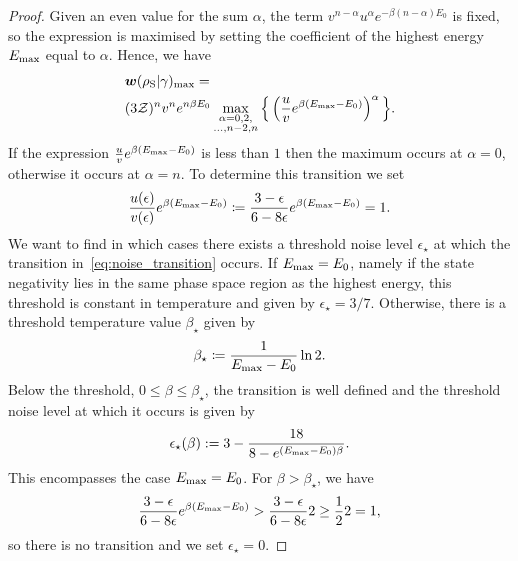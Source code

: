 \documentclass[pra,
aps,
twocolumn,
superscriptaddress,
groupedaddress,
nofootinbib,
reprint
]{revtex4-1}
\begin{document}
\begin{proof}
Given an even value for the sum $\alpha$, the term $v^{n-\alpha} u^{\alpha} e^{-\beta (n-\alpha)E_0}$ is fixed, so the expression is maximised by setting the coefficient of the highest energy $E_{\rm{max}}$ equal to $\alpha$.
Hence, we have
\begin{align}
	&\bm{w}(\rho_{\rm{S}} | \gamma)_{\rm{max}} = \nonumber\\
	&(3\mathcal{Z})^{n} v^n e^{n\beta E_0}\max\limits_{\substack{\alpha = 0,2, \\ \dots,n-2,n}}{\Big\{ \left( \frac{u}{v} e^{\beta (E_{\rm{max}} - E_0)} \right)^{\alpha} \Big\}}.
\end{align}
If the expression $\frac{u}{v} e^{\beta (E_{\rm{max}} - E_0)}$ is less than $1$ then the maximum occurs at $\alpha=0$, otherwise it occurs at $\alpha = n$. 
To determine this transition we set
\begin{equation}\label{eq:noise_transition}
	\frac{u(\epsilon)}{v(\epsilon)} e^{\beta (E_{\rm{max}} - E_0)} \coloneqq \frac{3-\epsilon}{6-8\epsilon} e^{\beta (E_{\rm{max}} - E_0)} = 1.
\end{equation}
We want to find in which cases there exists a threshold noise level $\epsilon_\star$ at which the transition in~\cref{eq:noise_transition} occurs.
If $E_{\rm{max}} = E_0$, namely if the state negativity lies in the same phase space region as the highest energy, this threshold is constant in temperature and given by $\epsilon_{\star} = 3/7$. 
Otherwise, there is a threshold temperature value $\beta_\star$ given by
\begin{equation}
	\beta_{\star} \coloneqq \frac{1}{E_{\rm{max}} - E_0} \ln2.
\end{equation}
Below the threshold, $0 \leq \beta \leq \beta_\star$, the transition is well defined and the threshold noise level at which it occurs is given by
\begin{equation}
	\epsilon_{\star}(\beta) := 3 - \dfrac{18}{8-e^{(E_{\rm{max}} - E_0)\beta}}.
\end{equation}
This encompasses the case $E_{\rm{max}} = E_0$.
For $\beta > \beta_\star$, we have
\begin{equation*}
	\frac{3-\epsilon}{6-8\epsilon} e^{\beta (E_{\rm{max}} - E_0)} > \frac{3-\epsilon}{6-8\epsilon} 2 \geq \frac{1}{2}2 = 1,
\end{equation*}
so there is no transition and we set $\epsilon_\star = 0$.


\end{proof}
\end{document}

